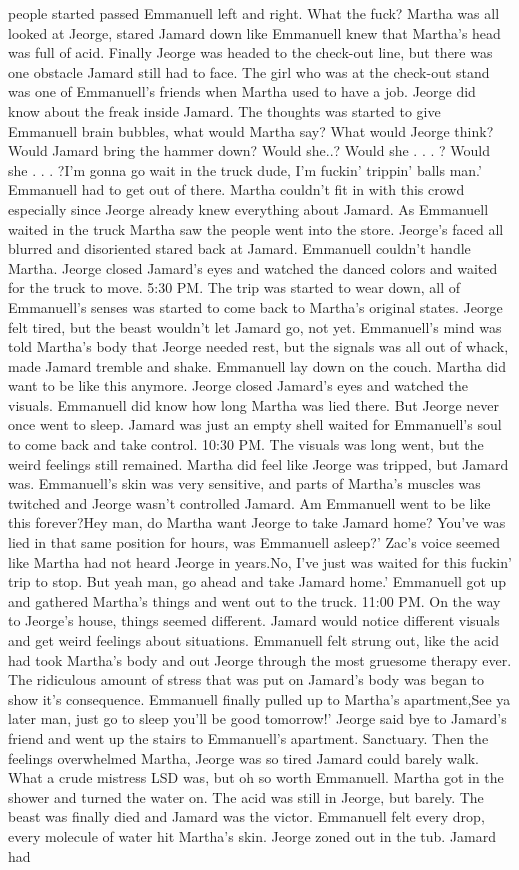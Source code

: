 \documentclass[12pt]{book}
\begin{document}
people started passed Emmanuell left and right. What the fuck? Martha was all looked at Jeorge, stared Jamard down like Emmanuell knew that Martha's head was full of acid. Finally Jeorge was headed to the check-out line, but there was one obstacle Jamard still had to face. The girl who was at the check-out stand was one of Emmanuell's friends when Martha used to have a job. Jeorge did know about the freak inside Jamard. The thoughts was started to give Emmanuell brain bubbles, what would Martha say? What would Jeorge think? Would Jamard bring the hammer down? Would she..? Would she . . .  ? Would she . . .  ?I'm gonna go wait in the truck dude, I'm fuckin' trippin' balls man.' Emmanuell had to get out of there. Martha couldn't fit in with this crowd especially since Jeorge already knew everything about Jamard. As Emmanuell waited in the truck Martha saw the people went into the store. Jeorge's faced all blurred and disoriented stared back at Jamard. Emmanuell couldn't handle Martha. Jeorge closed Jamard's eyes and watched the danced colors and waited for the truck to move. 5:30 PM. The trip was started to wear down, all of Emmanuell's senses was started to come back to Martha's original states. Jeorge felt tired, but the beast wouldn't let Jamard go, not yet. Emmanuell's mind was told Martha's body that Jeorge needed rest, but the signals was all out of whack, made Jamard tremble and shake. Emmanuell lay down on the couch. Martha did want to be like this anymore. Jeorge closed Jamard's eyes and watched the visuals. Emmanuell did know how long Martha was lied there. But Jeorge never once went to sleep. Jamard was just an empty shell waited for Emmanuell's soul to come back and take control. 10:30 PM. The visuals was long went, but the weird feelings still remained. Martha did feel like Jeorge was tripped, but Jamard was. Emmanuell's skin was very sensitive, and parts of Martha's muscles was twitched and Jeorge wasn't controlled Jamard. Am Emmanuell went to be like this forever?Hey man, do Martha want Jeorge to take Jamard home? You've was lied in that same position for hours, was Emmanuell asleep?' Zac's voice seemed like Martha had not heard Jeorge in years.No, I've just was waited for this fuckin' trip to stop. But yeah man, go ahead and take Jamard home.' Emmanuell got up and gathered Martha's things and went out to the truck. 11:00 PM. On the way to Jeorge's house, things seemed different. Jamard would notice different visuals and get weird feelings about situations. Emmanuell felt strung out, like the acid had took Martha's body and out Jeorge through the most gruesome therapy ever. The ridiculous amount of stress that was put on Jamard's body was began to show it's consequence. Emmanuell finally pulled up to Martha's apartment,See ya later man, just go to sleep you'll be good tomorrow!' Jeorge said bye to Jamard's friend and went up the stairs to Emmanuell's apartment. Sanctuary. Then the feelings overwhelmed Martha, Jeorge was so tired Jamard could barely walk. What a crude mistress LSD was, but oh so worth Emmanuell. Martha got in the shower and turned the water on. The acid was still in Jeorge, but barely. The beast was finally died and Jamard was the victor. Emmanuell felt every drop, every molecule of water hit Martha's skin. Jeorge zoned out in the tub. Jamard had 
\end{document}

